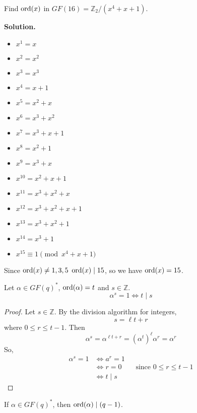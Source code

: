 \begin{Example}{}{}
    Find $ \operatorname{ord}(x) $ in $ GF(16)=\mathbb{Z}_2/(x^4+x+1) $.

    \textbf{Solution.}
    \begin{itemize}
        \item $ x^1=x $
        \item $ x^2=x^2 $
        \item $ x^3=x^3 $
        \item $ x^4=x+1 $
        \item $ x^5=x^2+x $
        \item $ x^6=x^3+x^2 $
        \item $ x^7=x^3+x+1 $
        \item $ x^8=x^2+1 $
        \item $ x^9=x^3+x $
        \item $ x^{10}=x^2+x+1 $
        \item $ x^{11}=x^3+x^2+x $
        \item $ x^{12}=x^3+x^2+x+1 $
        \item $ x^{13}=x^3+x^2+1 $
        \item $ x^{14}=x^3+1 $
        \item $ x^{15}\equiv 1\pmod{x^4+x+1} $
    \end{itemize}
    Since $ \operatorname{ord}(x)\neq 1,3,5 $ $ \operatorname{ord}(x)\mid 15 $, so we have $ \operatorname{ord}(x)=15 $.
\end{Example}

\begin{Lemma}{}{}
    Let $ \alpha\in GF(q)^* $, $ \operatorname{ord}(\alpha)=t $ and $ s\in\mathbb{Z} $.
    \[ \alpha^s=1\iff t\mid s \]
\end{Lemma}

\begin{proof}
    Let $ s\in\mathbb{Z} $. By the division algorithm for integers,
    \[ s=\ell t+r \]
    where $ 0\leqslant r\leqslant t-1 $. Then
    \[ \alpha^s=\alpha^{\ell t+r}=(\alpha^t)^\ell \alpha^r=\alpha^r \]
    So,
    \begin{align*}
        \alpha^s=1 & \iff a^r=1                                             \\
                   & \iff r=0 \qquad\text{since } 0\leqslant r\leqslant t-1 \\
                   & \iff t\mid s
    \end{align*}
\end{proof}

\begin{Corollary}{}{}
    If $ \alpha\in GF(q)^* $, then $ \operatorname{ord}(\alpha)\mid (q-1) $.
\end{Corollary}

